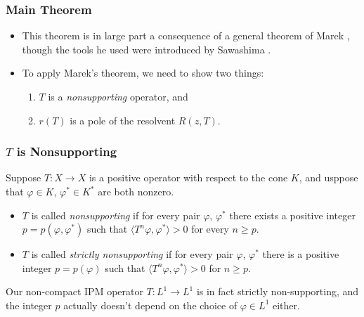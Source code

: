 \documentclass{beamer}
\begin{document}
\begin{frame}
	\frametitle{Main Theorem}
	\begin{itemize}
		\item This theorem is in large part a consequence of a general theorem of Marek \cite{Marek1970}, though the tools he used were introduced by Sawashima \cite{Sawashima1964}.
		\pause
		\item To apply Marek's theorem, we need to show two things:
		\begin{enumerate}
			\pause
			\item $T$ is a \emph{nonsupporting} operator, and
			\pause
			\item $r(T)$ is a pole of the resolvent $R(z, T)$.
		\end{enumerate}
	\end{itemize}
\end{frame}

\begin{frame}
	\frametitle{$T$ is Nonsupporting}
		\begin{definition}
			Suppose $T:X \to X$ is a positive operator with respect to the cone $K$, and usppose that $\varphi \in K$, $\varphi^* \in K^*$ are both nonzero.
			\begin{itemize}
				\pause
				\item $T$ is called \emph{nonsupporting} if for every pair $\varphi$, $\varphi^*$ there exists a positive integer $p = p(\varphi, \varphi^*)$ such that $\langle T^n \varphi, \varphi^* \rangle > 0$ for every $n \geq p$.
				\pause
				\item $T$ is called \emph{strictly nonsupporting} if for every pair $\varphi$, $\varphi^*$ there is a positive integer $p = p(\varphi)$ such that $\langle T^n \varphi, \varphi^* \rangle > 0$ for $n \geq p$.
			\end{itemize}
		\end{definition}
	\pause
	Our non-compact IPM operator $T:L^1 \to L^1$ is in fact strictly non-supporting, and the integer $p$ actually doesn't depend on the choice of $\varphi \in L^1$ either.
\end{frame}
\end{document}
